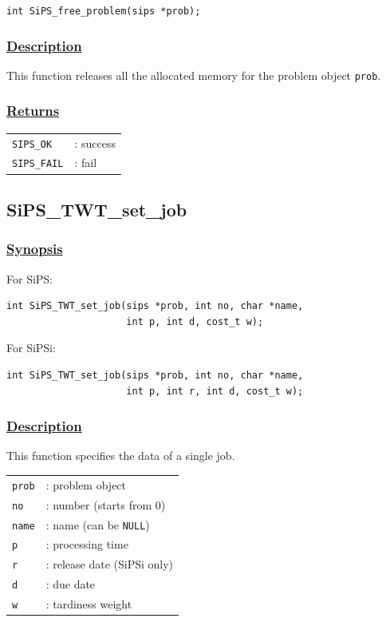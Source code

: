\documentclass[a4paper]{book}
\begin{document}
\verb+int SiPS_free_problem(sips *prob);+

\subsubsection{\underline{Description}}

This function releases all the allocated memory for the problem object \verb+prob+.

\subsubsection{\underline{Returns}}

\begin{tabular}{ll}
  \verb+SIPS_OK+  &: success\\
  \verb+SIPS_FAIL+&: fail\\
\end{tabular}

\hypertarget{SiPS_TWT_set_job}{%
\subsection{SiPS\_TWT\_set\_job}
}

\subsubsection{\underline{Synopsis}}

For SiPS:

\begin{verbatim}
int SiPS_TWT_set_job(sips *prob, int no, char *name,
                     int p, int d, cost_t w);
\end{verbatim}

\noindent
For SiPSi:

\begin{verbatim}
int SiPS_TWT_set_job(sips *prob, int no, char *name,
                     int p, int r, int d, cost_t w);
\end{verbatim}


\subsubsection{\underline{Description}}

This function specifies the data of a single job.

\begin{tabular}{ll}
  \verb+prob+ &: problem object\\
  \verb+no+   &: number (starts from $0$)\\
  \verb+name+ &: name (can be \verb+NULL+)\\
  \verb+p+    &: processing time\\
  \verb+r+    &: release date (SiPSi only)\\
  \verb+d+    &: due date\\
  \verb+w+    &: tardiness weight\\
\end{tabular}\\
\end{document}
